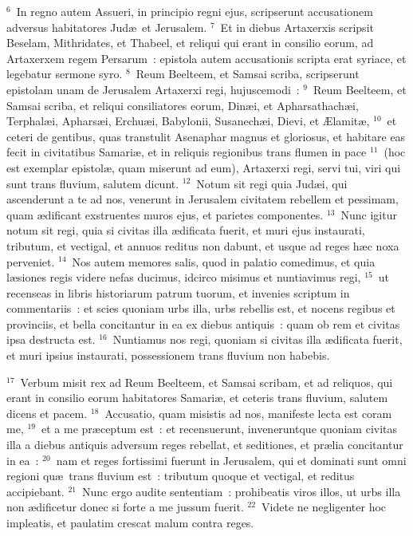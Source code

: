 ${}^{6}$~In regno autem Assueri, in principio regni ejus, scripserunt accusationem adversus habitatores Jud\ae\ et Jerusalem.
${}^{7}$~Et in diebus Artaxerxis scripsit Beselam, Mithridates, et Thabeel, et reliqui qui erant in consilio eorum, ad Artaxerxem regem Persarum~: epistola autem accusationis scripta erat syriace, et legebatur sermone syro.
${}^{8}$~Reum Beelteem, et Samsai scriba, scripserunt epistolam unam de Jerusalem Artaxerxi regi, hujuscemodi~:
${}^{9}$~Reum Beelteem, et Samsai scriba, et reliqui consiliatores eorum, Din\ae i, et Apharsathach\ae i, Terphal\ae i, Aphars\ae i, Erchu\ae i, Babylonii, Susanech\ae i, Dievi, et \AE lamit\ae ,
${}^{10}$~et ceteri de gentibus, quas transtulit Asenaphar magnus et gloriosus, et habitare eas fecit in civitatibus Samari\ae , et in reliquis regionibus trans flumen in pace
${}^{11}$~(hoc est exemplar epistol\ae , quam miserunt ad eum), Artaxerxi regi, servi tui, viri qui sunt trans fluvium, salutem dicunt.
${}^{12}$~Notum sit regi quia Jud\ae i, qui ascenderunt a te ad nos, venerunt in Jerusalem civitatem rebellem et pessimam, quam \ae dificant exstruentes muros ejus, et parietes componentes.
${}^{13}$~Nunc igitur notum sit regi, quia si civitas illa \ae dificata fuerit, et muri ejus instaurati, tributum, et vectigal, et annuos reditus non dabunt, et usque ad reges h\ae c noxa perveniet.
${}^{14}$~Nos autem memores salis, quod in palatio comedimus, et quia l\ae siones regis videre nefas ducimus, idcirco misimus et nuntiavimus regi,
${}^{15}$~ut recenseas in libris historiarum patrum tuorum, et invenies scriptum in commentariis~: et scies quoniam urbs illa, urbs rebellis est, et nocens regibus et provinciis, et bella concitantur in ea ex diebus antiquis~: quam ob rem et civitas ipsa destructa est.
${}^{16}$~Nuntiamus nos regi, quoniam si civitas illa \ae dificata fuerit, et muri ipsius instaurati, possessionem trans fluvium non habebis.


${}^{17}$~Verbum misit rex ad Reum Beelteem, et Samsai scribam, et ad reliquos, qui erant in consilio eorum habitatores Samari\ae , et ceteris trans fluvium, salutem dicens et pacem.
${}^{18}$~Accusatio, quam misistis ad nos, manifeste lecta est coram me,
${}^{19}$~et a me pr\ae ceptum est~: et recensuerunt, inveneruntque quoniam civitas illa a diebus antiquis adversum reges rebellat, et seditiones, et pr\ae lia concitantur in ea~:
${}^{20}$~nam et reges fortissimi fuerunt in Jerusalem, qui et dominati sunt omni regioni qu\ae\ trans fluvium est~: tributum quoque et vectigal, et reditus accipiebant.
${}^{21}$~Nunc ergo audite sententiam~: prohibeatis viros illos, ut urbs illa non \ae dificetur donec si forte a me jussum fuerit.
${}^{22}$~Videte ne negligenter hoc impleatis, et paulatim crescat malum contra reges.


